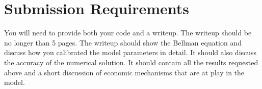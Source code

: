 \documentclass{article}
\begin{document}
\section*{Submission Requirements}
You will need to provide both your code and a writeup. The writeup should be no longer than 5 pages. The writeup should show the Bellman equation and discuss how you calibrated the model parameters in detail. It should also discuss the accuracy of the numerical solution. It should contain all the results requested above and a short discussion of economic mechanisms that are at play in the model.
\end{document}
